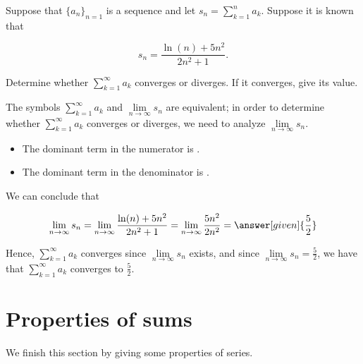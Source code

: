 \documentclass{ximera}
\begin{document}
\begin{example}
Suppose that $\{a_n\}_{n=1}$ is a sequence and let $s_n = \sum\limits_{k=1}^n a_k$.  Suppose it is known that

\[
s_n = \frac{\ln(n)+5n^2}{2n^2+1}.
\]

Determine whether $\sum\limits_{k=1}^{\infty} a_k$ converges or diverges.  If it converges, give its value.

\begin{explanation}
The symbols $\sum\limits_{k=1}^{\infty} a_k$ and $\lim\limits_{n \to \infty} s_n$ are equivalent; in order to determine whether $\sum\limits_{k=1}^{\infty} a_k$ converges or diverges, we need to analyze $\lim\limits_{n \to \infty} s_n$.  

\begin{itemize}
\item The dominant term in the numerator is .
\item The dominant term in the denominator is .
\end{itemize}
We can conclude that 

\[ \lim\limits_{n \to \infty} s_n = \lim\limits_{n \to \infty} \frac{\ln(n)+5n^2}{2n^2+1} =  \lim\limits_{n \to \infty} \frac{5n^2}{2n^2} = \answer[given]{\frac{5}{2}}\]

Hence, $\sum\limits_{k=1}^{\infty} a_k$ converges since  $\lim\limits_{n \to \infty} s_n$ exists, and since  $\lim\limits_{n \to \infty} s_n=\frac{5}{2}$, we have that $\sum\limits_{k=1}^{\infty} a_k$ converges to $\frac{5}{2}$.
\end{explanation}

\end{example}














\section*{Properties of sums}

We finish this section by giving some properties of series.
\end{document}
